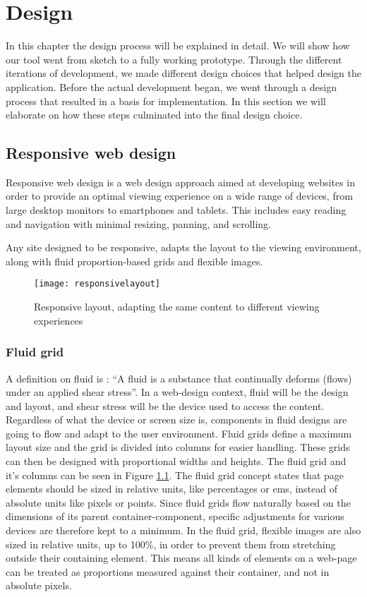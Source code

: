 \chapter{Design}
\label{chap:design}
In this chapter the design process will be explained in detail. We will show how our tool went from sketch to a fully working prototype. 
Through the different iterations of development, we made different design choices that helped design the application. Before the actual development began, we went
through a design process that resulted in a basis for implementation. In this section we will elaborate on how these steps culminated into the final design choice.
\section{Responsive web design}
Responsive web design\citep{responsivearticle} is a web design approach aimed at developing websites in order to provide an optimal viewing experience on a wide range of devices, from large desktop monitors to smartphones and tablets. This includes easy reading and navigation with minimal resizing, panning, and scrolling.

Any site designed to be responsive, adapts the layout to the viewing environment, along with fluid proportion-based grids and flexible images.

\begin{figure}[H]
\centering
	\texttt{[image: responsivelayout]}
\caption{Responsive layout, adapting the same content to different viewing experiences \citep{responsivelayout}}
\label{responsivelayout}
\end{figure}

\subsection{Fluid grid}
A definition on fluid is : ``A fluid is a substance that continually deforms (flows) under an applied shear stress''\citep{fluidgrid}. In a web-design context, fluid will be the design and layout, and shear stress will be the device used to access the content.
Regardless of what the device or screen size is, components in fluid designs are going to flow and adapt to the user environment. Fluid grids define a maximum layout size and the grid is divided into columns for easier handling. These grids can then be designed with proportional widths and heights. The fluid grid and it's columns can be seen in Figure \ref{responsivelayout}.
The fluid grid\citep{fluidgrid, fluidarticle} concept states that page elements should be sized in relative units, like percentages or ems, instead of absolute units like pixels or points. Since fluid grids flow naturally based on the dimensions of its parent container-component, specific adjustments for various devices are therefore kept to a minimum. In the fluid grid, flexible images are also sized in relative units, up to 100\%, in order to prevent them from stretching outside their containing element\citep{fluidimages}. This means all kinds of elements on a web-page can be treated as proportions measured against their container, and not in absolute pixels. 


